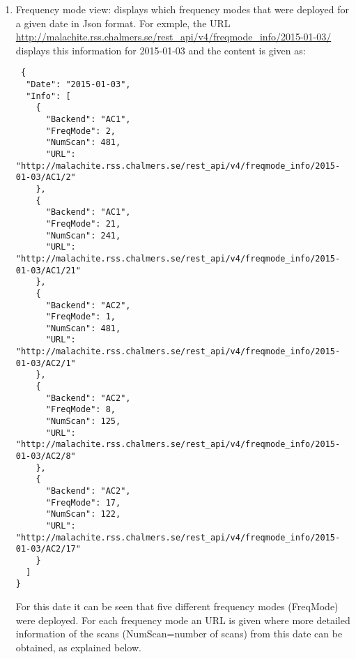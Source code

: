 \begin{enumerate}

\item Frequency mode view: displays which frequency modes that were deployed for a
 given date in Json format. For exmple, the URL
 \url{http://malachite.rss.chalmers.se/rest_api/v4/freqmode_info/2015-01-03/} 
 displays this information for 2015-01-03 and the content is given as: 
 \begin{scriptsize}
 \begin{verbatim}
 {
  "Date": "2015-01-03", 
  "Info": [
    {
      "Backend": "AC1", 
      "FreqMode": 2, 
      "NumScan": 481, 
      "URL": "http://malachite.rss.chalmers.se/rest_api/v4/freqmode_info/2015-01-03/AC1/2"
    }, 
    {
      "Backend": "AC1", 
      "FreqMode": 21, 
      "NumScan": 241, 
      "URL": "http://malachite.rss.chalmers.se/rest_api/v4/freqmode_info/2015-01-03/AC1/21"
    }, 
    {
      "Backend": "AC2", 
      "FreqMode": 1, 
      "NumScan": 481, 
      "URL": "http://malachite.rss.chalmers.se/rest_api/v4/freqmode_info/2015-01-03/AC2/1"
    }, 
    {
      "Backend": "AC2", 
      "FreqMode": 8, 
      "NumScan": 125, 
      "URL": "http://malachite.rss.chalmers.se/rest_api/v4/freqmode_info/2015-01-03/AC2/8"
    }, 
    {
      "Backend": "AC2", 
      "FreqMode": 17, 
      "NumScan": 122, 
      "URL": "http://malachite.rss.chalmers.se/rest_api/v4/freqmode_info/2015-01-03/AC2/17"
    }
  ]
}
 \end{verbatim}
\end{scriptsize}
For this date it can be seen that five different frequency modes (FreqMode) were deployed.
For each frequency mode an URL is given where more detailed information of
the scans (NumScan=number of scans) from this date can be obtained, as explained below.
 


\end{enumerate}
